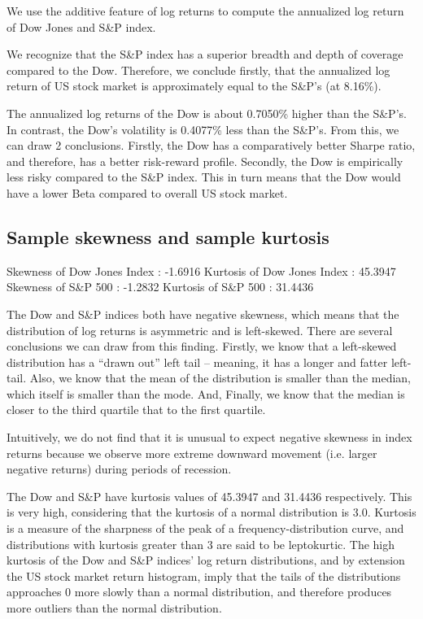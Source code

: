 \documentclass[a4paper]{article}
\begin{document}
We use the additive feature of log returns to compute the annualized log return of Dow Jones and S\&P index. 

We recognize that the S\&P index has a superior breadth and depth of coverage compared to the Dow. Therefore, we conclude firstly, that the annualized log return of US stock market is approximately equal to the S\&P’s (at 8.16\%).

The annualized log returns of the Dow is about 0.7050\% higher than the S\&P’s. In contrast, the Dow’s volatility is 0.4077\% less than the S\&P’s. From this, we can draw 2 conclusions. Firstly, the Dow has a comparatively better Sharpe ratio, and therefore, has a better risk-reward profile. Secondly, the Dow is empirically less risky compared to the S\&P index. This in turn means that the Dow would have a lower Beta compared to overall US stock market.


\subsection{Sample skewness and sample kurtosis}
\begin{flushleft}
Skewness of Dow Jones Index : -1.6916 \linebreak
Kurtosis of Dow Jones Index : 45.3947 \linebreak
Skewness of S\&P 500 : -1.2832 \linebreak
Kurtosis of S\&P 500 : 31.4436 \linebreak
\end{flushleft}

The Dow and S\&P indices both have negative skewness, which means that the distribution of log returns is asymmetric and is left-skewed. There are several conclusions we can draw from this finding. Firstly, we know that a left-skewed distribution has a “drawn out” left tail – meaning, it has a longer and fatter left-tail. Also, we know that the mean of the distribution is smaller than the median, which itself is smaller than the mode. And, Finally, we know that the median is closer to the third quartile that to the first quartile. 

Intuitively, we do not find that it is unusual to expect negative skewness in index returns because we observe more extreme downward movement (i.e. larger negative returns) during periods of recession.

The Dow and S\&P have kurtosis values of 45.3947 and 31.4436 respectively. This is very high, considering that the kurtosis of a normal distribution is 3.0. Kurtosis is a measure of the sharpness of the peak of a frequency-distribution curve, and distributions with kurtosis greater than 3 are said to be leptokurtic. The high kurtosis of the Dow and S\&P indices' log return distributions, and by extension the US stock market return histogram, imply that the tails of the distributions approaches 0 more slowly than a normal distribution, and therefore produces more outliers than the normal distribution. 
\end{document}
